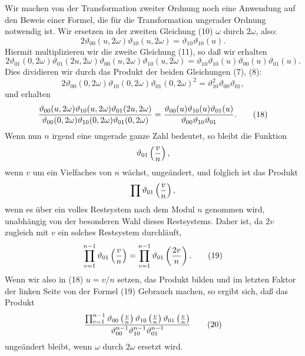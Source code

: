 \documentclass[11pt]{article}
\providecommand{\tht}{\vartheta}
\begin{document}
Wir machen von der Transformation zweiter Ordnung noch eine Anwendung auf den Beweis einer Formel, die für die Transformation ungerader Ordnung notwendig ist. Wir ersetzen in der zweiten Gleichung (10) $\omega$ durch $2\omega$, also:
\[
2\tht_{00}(u,2\omega)\tht_{10}(u,2\omega)=\tht_{10}\tht_{10}(u).
\]
Hiermit multiplizieren wir die zweite Gleichung (11), so daß wir erhalten
\[
2\tht_{01}(0,2\omega)\tht_{01}(2u,2\omega)\tht_{00}(u,2\omega)\tht_{10}(u,2\omega)
=\tht_{10}\tht_{10}(u)\tht_{00}(u)\tht_{01}(u).
\]
Dies dividieren wir durch das Produkt der beiden Gleichungen (7), (8):
\[
2\tht_{00}(0,2\omega)\tht_{10}(0,2\omega)\tht_{01}(0,2\omega)^2
=\tht_{10}^2\tht_{00}\tht_{01},
\]
und erhalten
\begin{equation}
{\tht_{00}(u,2\omega)\tht_{10}(u,2\omega)\tht_{01}(2u,2\omega)
\over
\tht_{00}(0,2\omega)\tht_{10}(0,2\omega)\tht_{01}(0,2\omega)}
=
{\tht_{00}(u)\tht_{10}(u)\tht_{01}(u)
\over \tht_{00}\tht_{10}\tht_{01}}. \tag{18}
\end{equation}
Wenn nun $n$ irgend eine ungerade ganze Zahl bedeutet, so bleibt die Funktion
\[
\tht_{01}\left({v\over n}\right),
\]
wenn $v$ um ein Vielfaches von $n$ wächst, ungeändert, und folglich ist das Produkt
\[
\prod \tht_{01}\left({v\over n}\right),
\]
wenn es über ein volles Restsystem nach dem Modul $n$ genommen wird, unabhängig von der besonderen Wahl dieses Restsystems. Daher ist, da $2v$ zugleich mit $v$ ein solches Restsystem durchläuft,
\begin{equation}
\prod_{v=1}^{n-1}\tht_{01}\left({v\over n}\right)=\prod_{v=1}^{n-1}\tht_{01}\left({2v\over n}\right). \tag{19}
\end{equation}
Wenn wir also in (18) $u=v/n$ setzen, das Produkt bilden und im letzten Faktor der linken Seite von der Formel (19) Gebrauch machen, so ergibt sich, daß das Produkt
\begin{equation}
{\prod_{v=1}^{n-1}\tht_{00}\left({v\over n}\right)
\tht_{10}\left({v\over n}\right)
\tht_{01}\left({v\over n}\right)
\over \tht_{00}^{n-1}\tht_{10}^{n-1}\tht_{01}^{n-1}} \tag{20}
\end{equation}
ungeändert bleibt, wenn $\omega$ durch $2\omega$ ersetzt wird.
\end{document}

